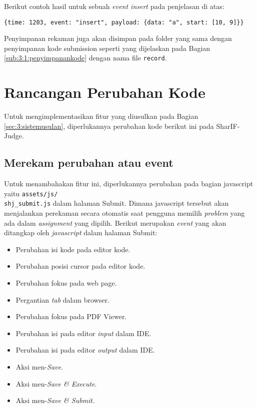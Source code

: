 Berikut contoh hasil untuk sebuah \textit{event insert} pada penjelasan di atas:

\begin{center}
    \verb|{time: 1203, event: "insert", payload: {data: "a", start: [10, 9]}}|
\end{center}

Penyimpanan rekaman juga akan disimpan pada folder yang sama dengan penyimpanan kode submission seperti yang dijelaskan pada Bagian \ref{sub:3:1:penyimpanankode} dengan nama file \verb|record|.

\section{Rancangan Perubahan Kode}

Untuk mengimplementasikan fitur yang diusulkan pada Bagian \ref{sec:3:sistemusulan}, diperlukannya perubahan kode berikut ini pada SharIF-Judge.

\subsection{Merekam perubahan atau event}
\label{sub:4:3:merekam}

Untuk menambahakan fitur ini, diperlukannya perubahan pada bagian javascript yaitu \verb|assets/js/|\\\verb|shj_submit.js| dalam halaman Submit. Dimana javascript tersebut akan menjalankan perekaman secara otomatis saat pengguna memilih \textit{problem} yang ada dalam \textit{assignment} yang dipilih. Berikut merupakan \textit{event} yang akan ditangkap oleh \textit{javascript} dalam halaman Submit:

\begin{itemize}
    \item Perubahan isi kode pada editor kode.
    \item Perubahan posisi cursor pada editor kode.
    \item Perubahan fokus pada web page.
    \item Pergantian \textit{tab} dalam browser.
    \item Perubahan fokus pada PDF Viewer.
    \item Perubahan isi pada editor \textit{input} dalam IDE.
    \item Perubahan isi pada editor \textit{output} dalam IDE.
    \item Aksi men-\textit{Save}.
    \item Aksi men-\textit{Save \& Execute}.
    \item Aksi men-\textit{Save \& Submit}.
\end{itemize}

